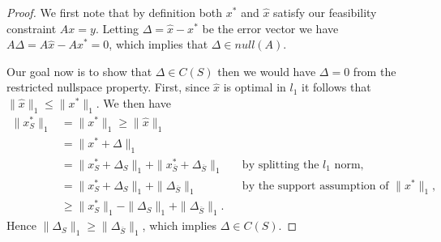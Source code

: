 \documentclass[11pt]{article}
\begin{document}
\begin{proof}
We first note that by definition both $x^*$ and $\hat{x}$ satisfy our feasibility constraint $Ax=y$. Letting $\Delta = \hat{x} - x^*$ be the error vector we have $A\Delta = A\hat{x} - Ax^* = 0$, which implies that $\Delta \in null(A)$.

Our goal now is to show that $\Delta \in C(S)$ then we would have $\Delta = 0$ from the restricted nullspace property. First, since $\hat{x}$ is optimal in $l_1$ it follows that $\|\hat{x}\|_1 \le \|x^*\|_1$. We then have
\begin{align*}
    \|x_S^*\|_1 &= \|x^*\|_1 \ge \|\hat{x}\|_1\\
                &= \|x^* + \Delta\|_1\\
                &= \|x_S^* + \Delta_S\|_1 + \|x_{\overline{S}}^* + \Delta_{\overline{S}}\|_1 &&\text{by splitting the $l_1$ norm,}\\                            
                &= \|x_S^* + \Delta_S\|_1 + \|\Delta_{\overline{S}}\|_1 &&\text{by the support assumption of $\|x^*\|_1$,}\\
                &\ge \|x_S^*\|_1 - \|\Delta_S\|_1 + \|\Delta_{\overline{S}}\|_1.
\end{align*}
Hence $\|\Delta_S\|_1 \ge \|\Delta_{\overline{S}}\|_1$, which implies $\Delta \in C(S)$.
\end{proof}
\end{document}

